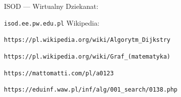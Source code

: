 \documentclass[12pt,a4paper]{article}
\begin{document}
\begin{thebibliography}{1}
ISOD — Wirtualny Dziekanat:

\texttt{isod.ee.pw.edu.pl}
Wikipedia:

\texttt{https://pl.wikipedia.org/wiki/Algorytm\_Dijkstry}

\texttt{https://pl.wikipedia.org/wiki/Graf\_(matematyka)}

\texttt{https://mattomatti.com/pl/a0123}

\texttt{https://eduinf.waw.pl/inf/alg/001\_search/0138.php}
\end{thebibliography}
\end{document}
